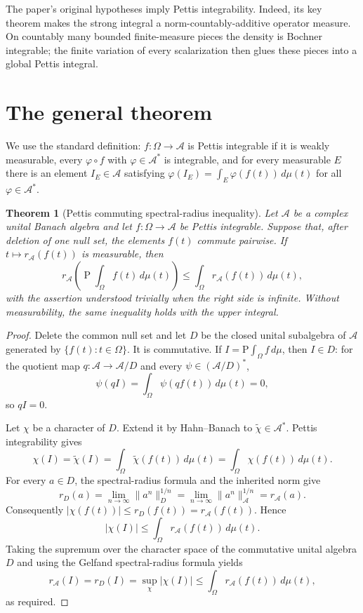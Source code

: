 \documentclass[11pt]{article}
\newtheorem{theorem}{Theorem}
\theoremstyle{remark}
\newcommand{\A}{\mathcal A}
\newcommand{\dd}{\,d\mu}
\begin{document}
The paper's original hypotheses imply Pettis integrability.  Indeed, its key
theorem makes the strong integral a norm-countably-additive operator measure.
On countably many bounded finite-measure pieces the density is Bochner
integrable; the finite variation of every scalarization then glues these
pieces into a global Pettis integral.

\section{The general theorem}

We use the standard definition: $f:\Omega\to\A$ is Pettis integrable if it is
weakly measurable, every $\varphi\circ f$ with $\varphi\in\A^*$ is integrable,
and for every measurable $E$ there is an element $I_E\in\A$ satisfying
$\varphi(I_E)=\int_E\varphi(f(t))\dd(t)$ for all $\varphi\in\A^*$.

\begin{theorem}[Pettis commuting spectral-radius inequality]\label{thm:main}
Let $\A$ be a complex unital Banach algebra and let
$f:\Omega\to\A$ be Pettis integrable.  Suppose that, after deletion of one
null set, the elements $f(t)$ commute pairwise.  If $t\mapsto r_\A(f(t))$ is
measurable, then
\[
 r_\A\!\left(\mathop{\mathrm{P}}\!\int_\Omega f(t)\dd(t)\right)
 \leq \int_\Omega r_\A(f(t))\dd(t),
\]
with the assertion understood trivially when the right side is infinite.
Without measurability, the same inequality holds with the upper integral.
\end{theorem}

\begin{proof}
Delete the common null set and let $D$ be the closed unital subalgebra of
$\A$ generated by $\{f(t):t\in\Omega\}$.  It is commutative.  If
$I=\mathrm{P}\!\int_\Omega f\dd$, then $I\in D$: for the quotient map
$q:\A\to\A/D$ and every $\psi\in(\A/D)^*$,
\[
 \psi(qI)=\int_\Omega \psi(qf(t))\dd(t)=0,
\]
so $qI=0$.

Let $\chi$ be a character of $D$.  Extend it by Hahn--Banach to
$\widetilde\chi\in\A^*$.  Pettis integrability gives
\[
 \chi(I)=\widetilde\chi(I)
 =\int_\Omega \widetilde\chi(f(t))\dd(t)
 =\int_\Omega \chi(f(t))\dd(t).
\]
For every $a\in D$, the spectral-radius formula and the inherited norm give
\[
 r_D(a)=\lim_{n\to\infty}\|a^n\|_D^{1/n}
       =\lim_{n\to\infty}\|a^n\|_\A^{1/n}=r_\A(a).
\]
Consequently
$|\chi(f(t))|\leq r_D(f(t))=r_\A(f(t))$.  Hence
\[
 |\chi(I)|\leq\int_\Omega r_\A(f(t))\dd(t).
\]
Taking the supremum over the character space of the commutative unital
algebra $D$ and using the Gelfand spectral-radius formula yields
\[
 r_\A(I)=r_D(I)=\sup_{\chi}|\chi(I)|
 \leq\int_\Omega r_\A(f(t))\dd(t),
\]
as required.
\end{proof}
\end{document}
